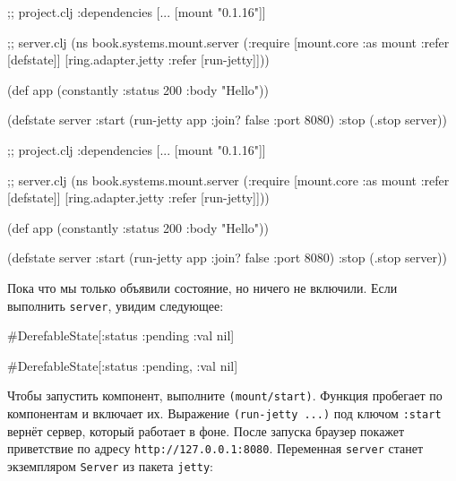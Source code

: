 \begin{english}
  \begin{clojure}
;; project.clj
:dependencies [... [mount "0.1.16"]]

;; server.clj
(ns book.systems.mount.server
  (:require
   [mount.core :as mount
    :refer [defstate]]
   [ring.adapter.jetty
    :refer [run-jetty]]))

(def app (constantly
           {:status 200 :body "Hello"}))

(defstate server
  :start (run-jetty app
           {:join? false :port 8080})
  :stop (.stop server))
  \end{clojure}
\end{english}

\else

\begin{english}
  \begin{clojure}
;; project.clj
:dependencies [... [mount "0.1.16"]]

;; server.clj
(ns book.systems.mount.server
  (:require
   [mount.core :as mount :refer [defstate]]
   [ring.adapter.jetty :refer [run-jetty]]))

(def app (constantly {:status 200 :body "Hello"}))

(defstate server
  :start (run-jetty app {:join? false :port 8080})
  :stop (.stop server))
  \end{clojure}
\end{english}

\fi

Пока что мы только объявили состояние, но ничего не включили. Если выполнить
\verb|server|, увидим следующее:

\ifx\DEVICETYPE\MOBILE

\begin{english}
  \begin{clojure}
#DerefableState[{:status :pending
                 :val nil}]
  \end{clojure}
\end{english}

\else

\begin{english}
  \begin{clojure}
#DerefableState[{:status :pending, :val nil}]
  \end{clojure}
\end{english}

\fi

\mnoindent
Чтобы запустить компонент, выполните \texttt{(mount\-/start)}. Функция пробегает
по компонентам и включает их. Выражение \verb|(run-jetty ...)| под ключом
\verb|:start| вернёт сервер, который работает в фоне. После запуска браузер
покажет приветствие по адресу \verb|http://127.0.0.1:8080|. Переменная
\verb|server| станет экземпляром \verb|Server| из пакета \verb|jetty|:

